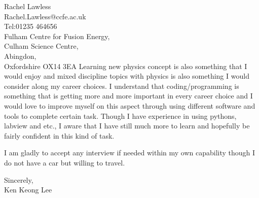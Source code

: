 \documentclass[11pt]{letter} %
\begin{document}
\begin{letter}{Rachel Lawless\\Rachel.Lawless@ccfe.ac.uk\\Tel:01235 464656\\Fulham Centre for Fusion Energy,\\Culham Science Centre,\\Abingdon,\\Oxfordshire OX14 3EA}
Learning new physics concept is also something that I would enjoy and mixed discipline topics with physics is also something I would consider along my career choices. I understand that coding/programming is something that is getting more and more important in every career choice and I would love to improve myself on this aspect through using different software and tools to complete certain task. Though I have experience in using pythons, labview and etc., I aware that I have still much more to learn and hopefully be fairly confident in this kind of task.

I am gladly to accept any interview if needed within my own capability though I do not have a car but willing to travel.


\closing{Sincerely,\\Ken Keong Lee}




\end{letter}
\end{document}
